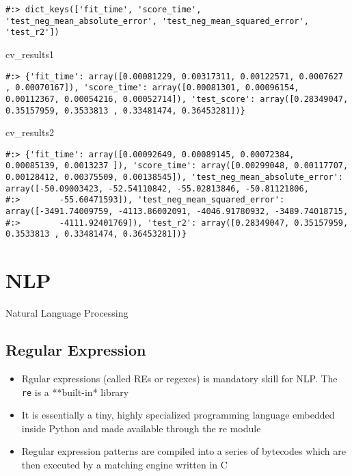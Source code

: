 \documentclass[
]{book}
\newenvironment{Shaded}{\begin{snugshade}}{\end{snugshade}}
\newcommand{\NormalTok}[1]{#1}
\providecommand{\tightlist}{%
  \setlength{\itemsep}{0pt}\setlength{\parskip}{0pt}}
\begin{document}
\begin{verbatim}
#:> dict_keys(['fit_time', 'score_time', 'test_neg_mean_absolute_error', 'test_neg_mean_squared_error', 'test_r2'])
\end{verbatim}

\begin{Shaded}
\begin{Highlighting}[]
\NormalTok{cv\_results1}
\end{Highlighting}
\end{Shaded}

\begin{verbatim}
#:> {'fit_time': array([0.00081229, 0.00317311, 0.00122571, 0.0007627 , 0.00070167]), 'score_time': array([0.00081301, 0.00096154, 0.00112367, 0.00054216, 0.00052714]), 'test_score': array([0.28349047, 0.35157959, 0.3533813 , 0.33481474, 0.36453281])}
\end{verbatim}

\begin{Shaded}
\begin{Highlighting}[]
\NormalTok{cv\_results2}
\end{Highlighting}
\end{Shaded}

\begin{verbatim}
#:> {'fit_time': array([0.00092649, 0.00089145, 0.00072384, 0.00085139, 0.0013237 ]), 'score_time': array([0.00299048, 0.00117707, 0.00128412, 0.00375509, 0.00138545]), 'test_neg_mean_absolute_error': array([-50.09003423, -52.54110842, -55.02813846, -50.81121806,
#:>        -55.60471593]), 'test_neg_mean_squared_error': array([-3491.74009759, -4113.86002091, -4046.91780932, -3489.74018715,
#:>        -4111.92401769]), 'test_r2': array([0.28349047, 0.35157959, 0.3533813 , 0.33481474, 0.36453281])}
\end{verbatim}

\hypertarget{nlp}{%
\chapter{NLP}\label{nlp}}

Natural Language Processing

\hypertarget{regular-expression}{%
\section{Regular Expression}\label{regular-expression}}

\begin{itemize}
\tightlist
\item
  Rgular expressions (called REs or regexes) is mandatory skill for NLP. The \texttt{re} is a **built-in* library\\
\item
  It is essentially a tiny, highly specialized programming language embedded inside Python and made available through the re module\\
\item
  Regular expression patterns are compiled into a series of bytecodes which are then executed by a matching engine written in C
\end{itemize}
\end{document}
